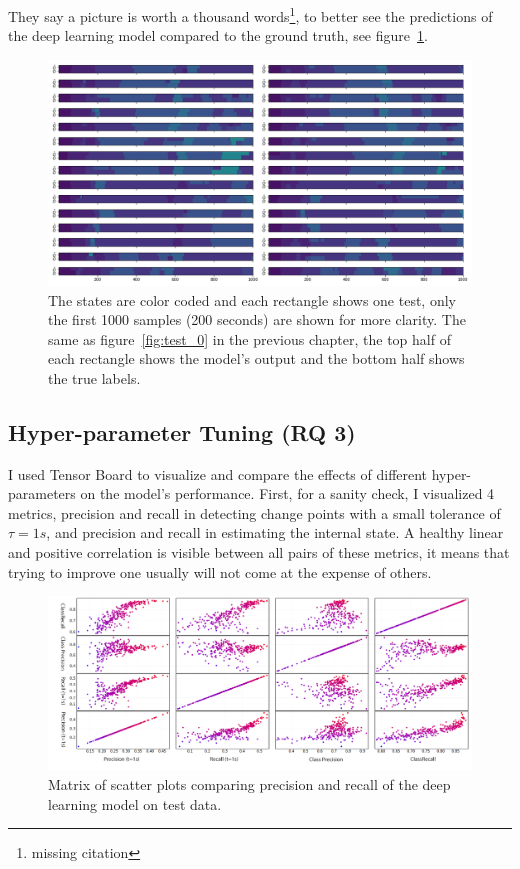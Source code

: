 They say a picture is worth a thousand words\footnote{missing citation}, to better see the predictions of the deep learning model compared to the ground truth, see figure~\ref{fig:paparazzi_predictions}. 
\begin{figure}
    \centering
    \includegraphics[width=\columnwidth]{6_files/states_chart.png}
    \caption{The states are color coded and each rectangle shows one test, only the first 1000 samples (200 seconds) are shown for more clarity. The same as figure~\ref{fig:test_0} in the previous chapter, the top half of each rectangle shows the model's output and the bottom half shows the true labels.}
    \label{fig:paparazzi_predictions}
\end{figure}

\subsection{Hyper-parameter Tuning (RQ 3)}
I used Tensor Board to visualize and compare the effects of different hyper-parameters on the model's performance. First, for a sanity check, I visualized 4 metrics, precision and recall in detecting change points with a small tolerance of $\tau=1s$, and precision and recall in estimating the internal state. A healthy linear and positive correlation is visible between all pairs of these metrics, it means that trying to improve one usually will not come at the expense of others. 
\begin{figure}
    \centering
    \includegraphics[width=\columnwidth]{6_files/prec_recall_matrix_tuning_white_background.png}
    \caption{Matrix of scatter plots comparing precision and recall of the deep learning model on test data.}
    \label{fig:precision_recall_matrix}
\end{figure}

